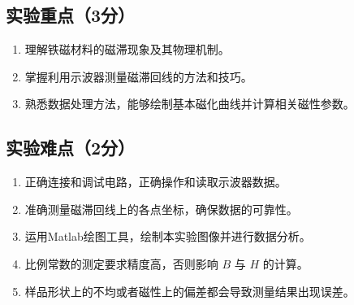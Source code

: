 \documentclass[]{../template/Report}%
\begin{document}
\subsection{实验重点（3分）}
\begin{enumerate}
    \item 理解铁磁材料的磁滞现象及其物理机制。
    \item 掌握利用示波器测量磁滞回线的方法和技巧。
    \item 熟悉数据处理方法，能够绘制基本磁化曲线并计算相关磁性参数。
\end{enumerate}
\subsection{实验难点（2分）}
\begin{enumerate}
    \item 正确连接和调试电路，正确操作和读取示波器数据。
    \item 准确测量磁滞回线上的各点坐标，确保数据的可靠性。
    \item 运用Matlab绘图工具，绘制本实验图像并进行数据分析。
    \item 比例常数的测定要求精度高，否则影响 $B$ 与 $H$ 的计算。
    \item 样品形状上的不均或者磁性上的偏差都会导致测量结果出现误差。

\end{enumerate}
\end{document}
